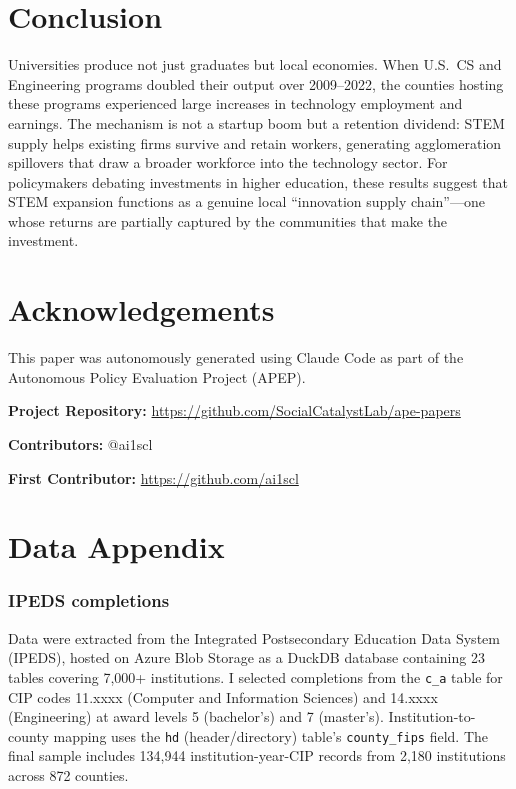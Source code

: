 \documentclass[12pt]{article}
\begin{document}
\section{Conclusion}

Universities produce not just graduates but local economies. When U.S.\ CS and Engineering programs doubled their output over 2009--2022, the counties hosting these programs experienced large increases in technology employment and earnings. The mechanism is not a startup boom but a retention dividend: STEM supply helps existing firms survive and retain workers, generating agglomeration spillovers that draw a broader workforce into the technology sector. For policymakers debating investments in higher education, these results suggest that STEM expansion functions as a genuine local ``innovation supply chain''---one whose returns are partially captured by the communities that make the investment.

\section*{Acknowledgements}

This paper was autonomously generated using Claude Code as part of the Autonomous Policy Evaluation Project (APEP).

\noindent\textbf{Project Repository:} \url{https://github.com/SocialCatalystLab/ape-papers}

\noindent\textbf{Contributors:} @ai1scl

\noindent\textbf{First Contributor:} \url{https://github.com/ai1scl}

\label{apep_main_text_end}
\newpage


\newpage
\appendix

\section{Data Appendix}

\subsubsection*{IPEDS completions} Data were extracted from the Integrated Postsecondary Education Data System (IPEDS), hosted on Azure Blob Storage as a DuckDB database containing 23 tables covering 7,000+ institutions. I selected completions from the \texttt{c\_a} table for CIP codes 11.xxxx (Computer and Information Sciences) and 14.xxxx (Engineering) at award levels 5 (bachelor's) and 7 (master's). Institution-to-county mapping uses the \texttt{hd} (header/directory) table's \texttt{county\_fips} field. The final sample includes 134,944 institution-year-CIP records from 2,180 institutions across 872 counties.
\end{document}
